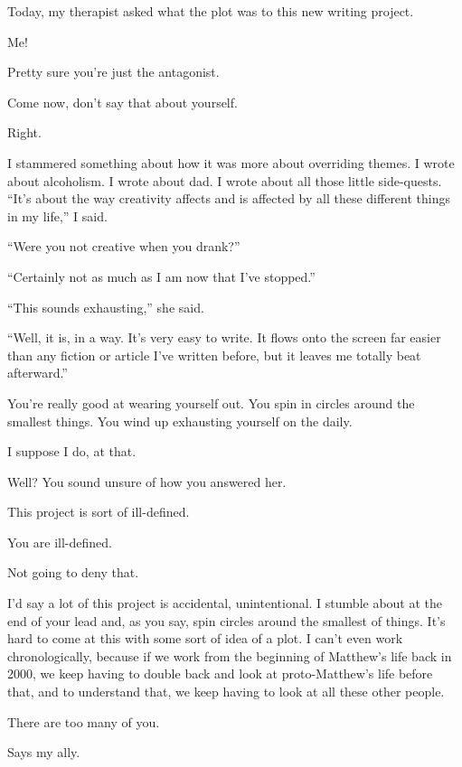 Today, my therapist asked what the plot was to this new writing project.

\begin{ally}
Me!
\end{ally}
Pretty sure you're just the antagonist.

\begin{ally}
Come now, don't say that about yourself.
\end{ally}
Right.

I stammered something about how it was more about overriding themes. I wrote about alcoholism. I wrote about dad. I wrote about all those little side-quests. ``It's about the way creativity affects and is affected by all these different things in my life,'' I said.

``Were you not creative when you drank?''

``Certainly not as much as I am now that I've stopped.''

``This sounds exhausting,'' she said.

``Well, it is, in a way. It's very easy to write. It flows onto the screen far easier than any fiction or article I've written before, but it leaves me totally beat afterward.''

\begin{ally}
You're really good at wearing yourself out. You spin in circles around the smallest things. You wind up exhausting yourself on the daily.
\end{ally}
I suppose I do, at that.

\begin{ally}
Well? You sound unsure of how you answered her.
\end{ally}
This project is sort of ill-defined.

\begin{ally}
You are ill-defined.
\end{ally}
Not going to deny that.

I'd say a lot of this project is accidental, unintentional. I stumble about at the end of your lead and, as you say, spin circles around the smallest of things. It's hard to come at this with some sort of idea of a plot. I can't even work chronologically, because if we work from the beginning of Matthew's life back in 2000, we keep having to double back and look at proto-Matthew's life before that, and to understand that, we keep having to look at all these other people.

\begin{ally}
There are too many of you.
\end{ally}
Says my ally.


